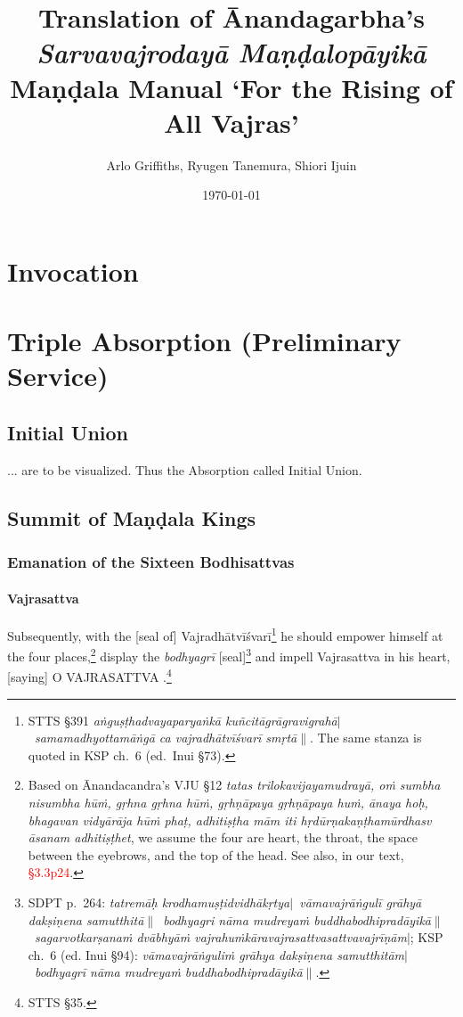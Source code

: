 \documentclass[11pt]{book}
\title{Translation of Ānandagarbha's \emph{Sarvavajrodayā Maṇḍalopāyikā}\\
Maṇḍala Manual `For the Rising of All Vajras'}
\author{Arlo Griffiths, Ryugen Tanemura, Shiori Ijuin}
\date{\today}
\makeatletter
\def\fakesc#1{%
  \begingroup%
  \xdef\fake@name{\csname\curr@fontshape/\f@size\endcsname}%
  \fontsize{1.3\fontdimen8\fake@name}{\baselineskip}\selectfont%
  \uppercase{#1}%
  \endgroup%
}
\newcommand{\mantra}[1]{\fakesc{#1}}
\newcommand{\danda}{\thinspace$\mid$}
\newcommand{\ddanda}{\thinspace$\parallel$}
\newcommand{\red}[1]{\textcolor{red}{#1}}
\newcommand{\skt}[1]{\emph{#1}}
\makeatother
\begin{document}
\maketitle



\chapter{Invocation}

\chapter{Triple Absorption (Preliminary Service)}

\section{Initial Union}

... are to be visualized. Thus the Absorption called Initial Union.

\section{Summit of Maṇḍala Kings}

\subsection{Emanation of the Sixteen Bodhisattvas}

\subsubsection{Vajrasattva}

Subsequently, with the [seal of] Vajradhātvīśvarī\footnote{STTS §391 \skt{aṅguṣṭhadvayaparyaṅkā kuñcitāgrāgravigrahā\danda\ 
samamadhyottamāṅgā ca vajradhātvīśvarī smṛtā\ddanda}. The same stanza is quoted in KSP ch.~6 (ed.\ Inui §73).} he should empower himself at the four places,\footnote{Based on Ānandacandra's VJU §12 \skt{tatas trilokavijayamudrayā, oṁ sumbha nisumbha hūṁ, gṛhna gṛhna hūṁ, gṛhṇāpaya gṛhṇāpaya huṁ, ānaya hoḥ, bhagavan vidyārāja hūṁ phaṭ, adhitiṣṭha mām iti hṛdūrṇakaṇṭhamūrdhasv āsanam adhitiṣṭhet}, we assume the four are heart, the throat, the space between the eyebrows, and the top of the head. See also, in our text, \red{§3.3p24}.
} display the \skt{bodhyagrī} [seal]\footnote{SDPT p.~264: \skt{tatremāḥ krodhamuṣṭidvidhākṛtya\danda\ vāmavajrāṅgulī grāhyā dakṣiṇena samutthitā\ddanda\ bodhyagri nāma mudreyaṁ buddhabodhipradāyikā\ddanda\ sagarvotkarṣanaṁ dvābhyāṁ vajrahuṁkāravajrasattvasattvavajrīṇām\danda}; KSP ch.~6 (ed. Inui §94):
\skt{vāmavajrāṅguliṁ grāhya dakṣiṇena samutthitām\danda\ bodhyagrī nāma mudreyaṁ buddhabodhipradāyikā\ddanda}.} and impell Vajrasattva in his heart, [saying] \mantra{o Vajrasattva}.\footnote{STTS §35.}
\end{document}
